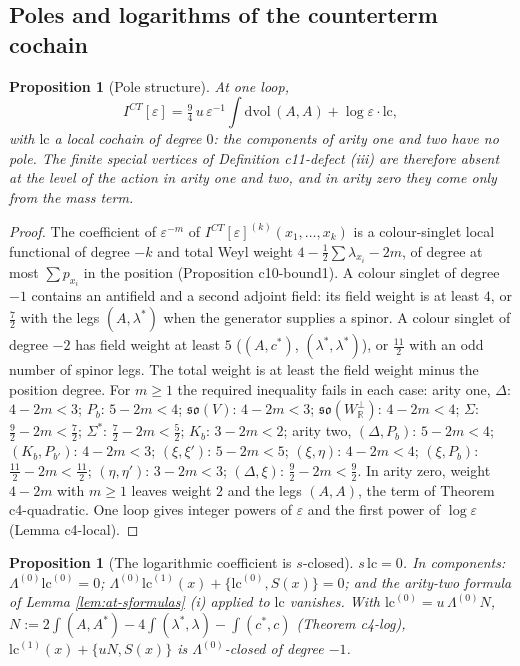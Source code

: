 \documentclass[11pt]{article}
\numberwithin{equation}{section}
\theoremstyle{plain}
\newtheorem{proposition}[theorem]{Proposition}
\theoremstyle{definition}
\newcommand{\ICT}{I^{CT}[\varepsilon]}
\newcommand{\lc}{\mathrm{lc}}
\begin{document}
\subsection{Poles and logarithms of the counterterm cochain}

\begin{proposition}[Pole structure]
\label{prop:at-poles}
At one loop,
\[
\ICT=\tfrac94\,u\,\varepsilon^{-1}\int\mathrm{dvol}\,(A,A)+\log\varepsilon\cdot\lc,
\]
with $\lc$ a local cochain of degree $0$: the components of arity one and two have no pole. The finite special vertices of Definition c11-defect (iii) are therefore absent at the level of the action in arity one and two, and in arity zero they come only from the mass term.
\end{proposition}

\begin{proof}
The coefficient of $\varepsilon^{-m}$ of $\ICT^{(k)}(x_1,\dots,x_k)$ is a colour-singlet local functional of degree $-k$ and total Weyl weight $4-\tfrac12\sum\lambda_{x_i}-2m$, of degree at most $\sum p_{x_i}$ in the position (Proposition c10-bound1). A colour singlet of degree $-1$ contains an antifield and a second adjoint field: its field weight is at least $4$, or $\tfrac72$ with the legs $(A,\lambda^*)$ when the generator supplies a spinor. A colour singlet of degree $-2$ has field weight at least $5$ ($(A,c^*)$, $(\lambda^*,\lambda^*)$), or $\tfrac{11}2$ with an odd number of spinor legs. The total weight is at least the field weight minus the position degree. For $m\ge1$ the required inequality fails in each case: arity one, $\Delta$: $4-2m<3$; $P_b$: $5-2m<4$; $\mathfrak{so}(V)$: $4-2m<3$; $\mathfrak{so}(W^\perp_{\mathbb R})$: $4-2m<4$; $\Sigma$: $\tfrac92-2m<\tfrac72$; $\Sigma^*$: $\tfrac72-2m<\tfrac52$; $K_b$: $3-2m<2$; arity two, $(\Delta,P_b)$: $5-2m<4$; $(K_b,P_{b'})$: $4-2m<3$; $(\xi,\xi')$: $5-2m<5$; $(\xi,\eta)$: $4-2m<4$; $(\xi,P_b)$: $\tfrac{11}2-2m<\tfrac{11}2$; $(\eta,\eta')$: $3-2m<3$; $(\Delta,\xi)$: $\tfrac92-2m<\tfrac92$. In arity zero, weight $4-2m$ with $m\ge1$ leaves weight $2$ and the legs $(A,A)$, the term of Theorem c4-quadratic. One loop gives integer powers of $\varepsilon$ and the first power of $\log\varepsilon$ (Lemma c4-local).
\end{proof}

\begin{proposition}[The logarithmic coefficient is $s$-closed]
\label{prop:at-log}
$s\,\lc=0$. In components: $\Lambda^{(0)}\lc^{(0)}=0$; $\Lambda^{(0)}\lc^{(1)}(x)+\{\lc^{(0)},S(x)\}=0$; and the arity-two formula of Lemma \ref{lem:at-sformulas} (i) applied to $\lc$ vanishes. With $\lc^{(0)}=u\,\Lambda^{(0)}N$, $N:=2\int(A,A^*)-4\int(\lambda^*,\lambda)-\int(c^*,c)$ (Theorem c4-log), $\lc^{(1)}(x)+\{uN,S(x)\}$ is $\Lambda^{(0)}$-closed of degree $-1$.
\end{proposition}
\end{document}
